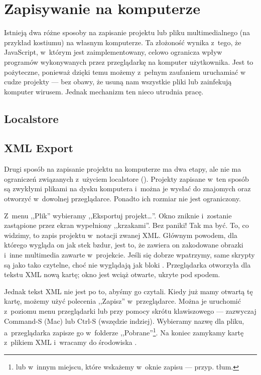 \documentclass[a4paper]{report}
\begin{document}
\section{Zapisywanie na komputerze}

Istnieją dwa różne sposoby na zapisanie projektu lub pliku multimedialnego (na przykład kostiumu) na własnym komputerze. Ta złożoność wynika z~tego, że JavaScript, w~którym \Snap{} jest zaimplementowany, celowo ogranicza wpływ programów wykonywanych przez przeglądarkę na komputer użytkownika. Jest to pożyteczne, ponieważ dzięki temu możemy z~pełnym zaufaniem uruchamiać w~ cudze projekty --- bez obawy, że usuną nam wszystkie pliki lub zainfekują komputer wirusem. Jednak mechanizm ten nieco utrudnia pracę.

\subsection{Localstore}

{\Huge \TODO{}}

\subsection{XML Export}

Drugi sposób na zapisanie projektu na komputerze ma dwa etapy, ale nie ma ograniczeń związanych z~użyciem localstore (). Projekty zapisane w~ten sposób są zwykłymi plikami na dysku komputera i~można je wysłać do znajomych oraz otworzyć w~dowolnej przeglądarce. Ponadto ich rozmiar nie jest ograniczony.

Z~menu ,,Plik''  wybieramy ,,Eksportuj projekt\ldots''. Okno  zniknie i~zostanie zastąpione przez ekran wypełniony ,,krzakami''. Bez paniki! Tak ma być. To, co widzimy, to zapis projektu w~notacji zwanej XML. Głównym powodem, dla którego wygląda on jak stek bzdur, jest to, że zawiera on zakodowane obrazki i~inne multimedia zawarte w~projekcie. Jeśli się dobrze wpatrzymy, same skrypty są jako tako czytelne, choć nie wyglądają jak bloki . Przeglądarka otworzyła dla tekstu XML nową kartę; okno  jest wciąż otwarte, ukryte pod spodem.

Jednak tekst XML nie jest po to, abyśmy go czytali. Kiedy już mamy otwartą tę kartę, możemy użyć polecenia ,,Zapisz'' w~przeglądarce. Można je uruchomić z~poziomu menu przeglądarki lub przy pomocy skrótu klawiszowego --- zazwyczaj Command-S (Mac) lub Ctrl-S (wszędzie indziej). Wybieramy nazwę dla pliku, a~przeglądarka zapisze go w~folderze ,,Pobrane''\footnote{lub w~innym miejscu, które wskażemy w~oknie zapisu --- przyp. tłum.}. Na koniec zamykamy kartę z~plikiem XML i~wracamy do środowiska \Snap{}.
\end{document}
